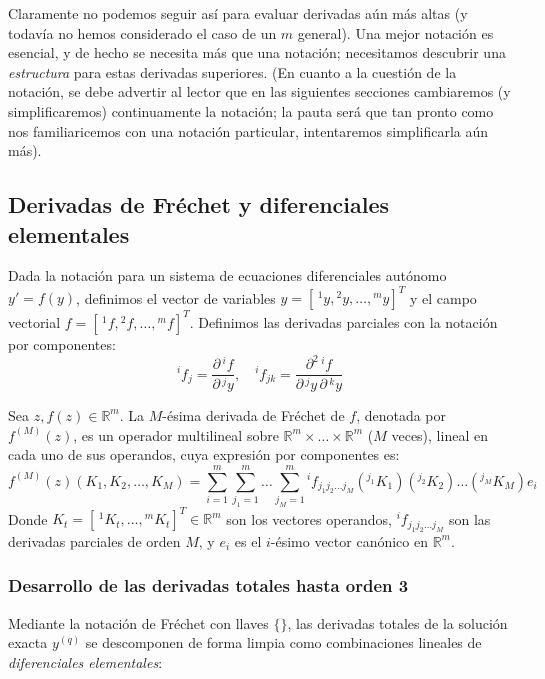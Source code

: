 Claramente no podemos seguir así para evaluar derivadas aún más altas (y todavía no hemos considerado el caso de un $m$ general). Una mejor notación es esencial, y de hecho se necesita más que una notación; necesitamos descubrir una \textit{estructura} para estas derivadas superiores. (En cuanto a la cuestión de la notación, se debe advertir al lector que en las siguientes secciones cambiaremos (y simplificaremos) continuamente la notación; la pauta será que tan pronto como nos familiaricemos con una notación particular, intentaremos simplificarla aún más).


\subsection{Derivadas de Fréchet y diferenciales elementales}

Dada la notación para un sistema de ecuaciones diferenciales autónomo $y' = f(y)$, definimos el vector de variables $y = [\, \!^1y, \!^2y, \dots, \!^my]^T$ y el campo vectorial $f = [\, \!^1f, \!^2f, \dots, \!^mf]^T$.
Definimos las derivadas parciales con la notación por componentes:
$$ {\!^i}f_j = \frac{\partial \, \!^if}{\partial \, \!^jy}, \quad {\!^i}f_{jk} = \frac{\partial^2 \, {\!^i}f}{\partial \, \!^jy \, \partial \, \!^ky} $$

\begin{defi}
Sea $z, f(z) \in \mathbb{R}^m$. La $M$-ésima derivada de Fréchet de $f$, denotada por $f^{(M)}(z)$, es un operador multilineal sobre $\mathbb{R}^m \times \dots \times \mathbb{R}^m$ ($M$ veces), lineal en cada uno de sus operandos, cuya expresión por componentes es:
\[
f^{(M)}(z)(K_1, K_2, \dots, K_M) = \sum_{i=1}^{m} \sum_{j_1=1}^{m} \dots \sum_{j_M=1}^{m} {^i}f_{j_1 j_2 \dots j_M} \left(^{j_1}K_1\right) \left(^{j_2}K_2\right) \dots \left(^{j_M}K_M\right) e_i
\]
Donde $K_t = \left[ \, {\!^1}K_t, \dots, {\!^m}K_t \right]^T \in \mathbb{R}^m$ son los vectores operandos, ${\!^i}f_{j_1 j_2 \dots j_M}$ son las derivadas parciales de orden $M$, y $e_i$ es el $i$-ésimo vector canónico en $\mathbb{R}^m$.
\end{defi}

\subsubsection*{Desarrollo de las derivadas totales hasta orden 3}
Mediante la notación de Fréchet con llaves $\{\}$, las derivadas totales de la solución exacta $y^{(q)}$ se descomponen de forma limpia como combinaciones lineales de \textit{diferenciales elementales}:

